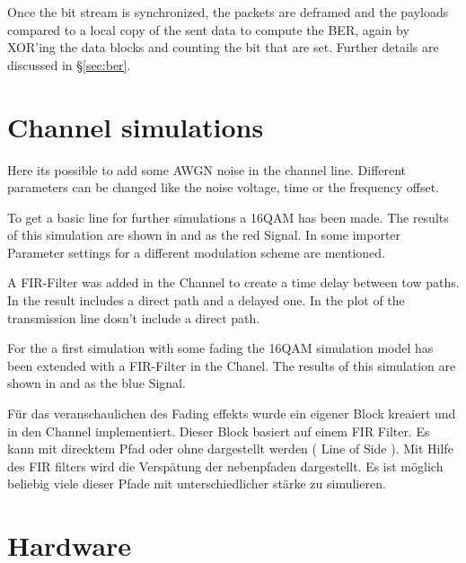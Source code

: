 Once the bit stream is synchronized, the packets are deframed and the payloads compared to a local copy of the sent data to compute the BER, again by XOR'ing the data blocks and counting the bit that are set. Further details are discussed in \S\ref{sec:ber}.

\section{Channel simulations}

Here its possible to add some AWGN noise in the channel line. Different parameters can be changed like the noise voltage, time or the frequency offset.


To get a basic line for further simulations a 16QAM has been made. The results of this simulation are shown in  and  as the red Signal. In  some importer Parameter settings for a different modulation scheme are mentioned.

A FIR-Filter was added in the Channel to create a time delay between tow paths. In  the result includes a direct path and a delayed one. In the plot of  the transmission line dosn't include a direct path. %

For the a first simulation with some fading the 16QAM simulation model has been extended with a FIR-Filter in the Chanel. The results of this simulation are shown in  and  as the blue Signal.

Für das veranschaulichen des Fading effekts wurde ein eigener Block kreaiert und in den Channel implementiert. Dieser Block basiert auf einem FIR Filter. Es kann mit direcktem Pfad oder ohne dargestellt werden ( Line of Side ). Mit Hilfe des FIR filters wird die Verspätung der nebenpfaden dargestellt. Es ist möglich beliebig viele dieser Pfade mit unterschiedlicher stärke zu simulieren.




\section{Hardware}

